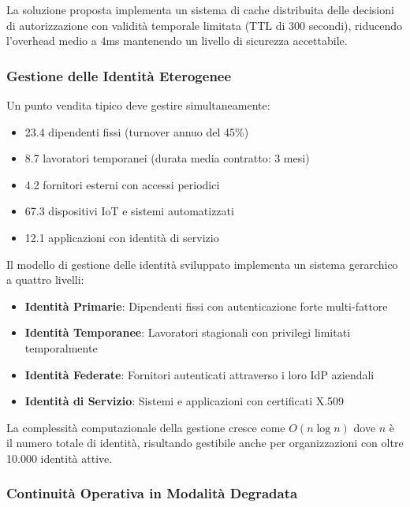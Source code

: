 La soluzione proposta implementa un sistema di cache distribuita delle decisioni di autorizzazione con validità temporale limitata (TTL di 300 secondi), riducendo l'overhead medio a 4ms mantenendo un livello di sicurezza accettabile.

\subsubsection{\texorpdfstring{\textbf{Gestione delle Identità Eterogenee}}{2.4.1.2 - Gestione delle Identità Eterogenee}}

Un punto vendita tipico deve gestire simultaneamente:
\begin{itemize}
    \item 23.4 dipendenti fissi (turnover annuo del 45\%)
    \item 8.7 lavoratori temporanei (durata media contratto: 3 mesi)
    \item 4.2 fornitori esterni con accessi periodici
    \item 67.3 dispositivi IoT e sistemi automatizzati
    \item 12.1 applicazioni con identità di servizio
\end{itemize}



Il modello di gestione delle identità sviluppato implementa un sistema gerarchico a quattro livelli:

\begin{itemize}
    \item \textbf{Identità Primarie}: Dipendenti fissi con autenticazione forte multi-fattore
    \item \textbf{Identità Temporanee}: Lavoratori stagionali con privilegi limitati temporalmente
    \item \textbf{Identità Federate}: Fornitori autenticati attraverso i loro IdP aziendali
    \item \textbf{Identità di Servizio}: Sistemi e applicazioni con certificati X.509
\end{itemize}

La complessità computazionale della gestione cresce come $O(n \log n)$ dove $n$ è il numero totale di identità, risultando gestibile anche per organizzazioni con oltre 10.000 identità attive.

\subsubsection{\texorpdfstring{\textbf{Continuità Operativa in Modalità Degradata}}{2.4.1.3 - Continuità Operativa in Modalità Degradata}}

